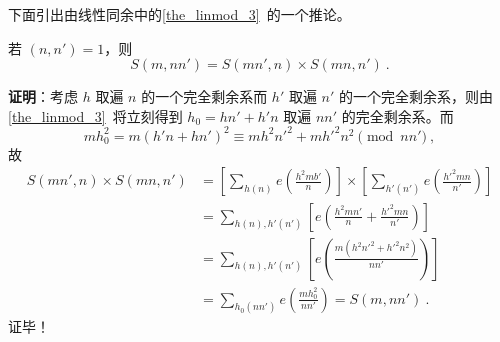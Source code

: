 下面引出由线性同余中的\autoref{the_linmod_3}~的一个推论。
\begin{corollary}{}
若 $(n, n') = 1$，则
\begin{equation}
S(m, nn') = S(mn', n) \times S(mn, n') ~.
\end{equation}

\end{corollary}
\textbf{证明}：考虑 $h$ 取遍 $n$ 的一个完全剩余系而 $h'$ 取遍 $n'$ 的一个完全剩余系，则由\autoref{the_linmod_3}~将立刻得到 $h_0 = hn' +h'n$ 取遍 $nn'$ 的完全剩余系。而
\begin{equation}
mh_0^2 = m(h'n + hn')^2 \equiv mh^2n'^2 + mh'^2n^2 \pmod{nn'} ~,
\end{equation}
故
\begin{equation}
\begin{aligned}
S(mn', n) \times S(mn, n') &= \left[ \sum_{h(n)} e\left(\frac{h^2mb'}{n}\right) \right] \times \left[\sum_{h'(n')} e\left(\frac{h'^2mn}{n'}\right)\right] \\
&= \sum_{h(n), h'(n')} \left[ e\left(\frac{h^2 mn'}{n} + \frac{h'^2 mn}{n'}\right)\right] \\
&= \sum_{h(n), h'(n')} \left[ e\left( \frac{m(h^2 n'^2 + h'^2 n^2)}{nn'} \right)\right]\\
&= \sum_{h_0(nn')} e\left( \frac{m h_0^2}{nn'} \right) = S(m, nn')~.
\end{aligned}
\end{equation}
证毕！